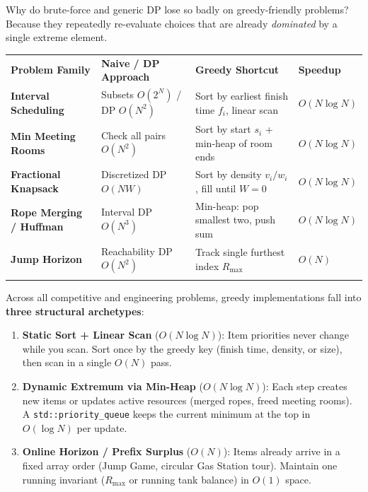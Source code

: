 \documentclass[11pt,a4paper]{article}
\theoremstyle{definition}
\begin{document}
Why do brute-force and generic DP lose so badly on greedy-friendly problems? Because they repeatedly re-evaluate choices that are already \emph{dominated} by a single extreme element.

\begingroup\small{}
\begin{tabularx}{\textwidth}{>{\raggedright\arraybackslash\bfseries}p{3.4cm} >{\raggedright\arraybackslash}p{3.5cm} >{\raggedright\arraybackslash}X >{\centering\arraybackslash}p{2.3cm}}
\arrayrulecolor{primaryblue}\toprule[1.2pt]
\rowcolor{primaryblue!10}
\textcolor{primaryblue}{\textbf{Problem Family}} & \textcolor{primaryblue}{\textbf{Naive / DP Approach}} & \textcolor{primaryblue}{\textbf{Greedy Shortcut}} & \textcolor{primaryblue}{\textbf{Speedup}} \\
\arrayrulecolor{codeframe}\midrule[0.6pt]
Interval Scheduling & Subsets $O(2^N)$ / DP $O(N^2)$ & Sort by earliest finish time $f_i$, linear scan & $O(N \log N)$ \\
Min Meeting Rooms & Check all pairs $O(N^2)$ & Sort by start $s_i$ + min-heap of room ends & $O(N \log N)$ \\
Fractional Knapsack & Discretized DP $O(N W)$ & Sort by density $v_i / w_i$, fill until $W = 0$ & $O(N \log N)$ \\
Rope Merging / Huffman & Interval DP $O(N^3)$ & Min-heap: pop smallest two, push sum & $O(N \log N)$ \\
Jump Horizon & Reachability DP $O(N^2)$ & Track single furthest index $R_{\max}$ & $O(N)$ \\
\arrayrulecolor{primaryblue}\bottomrule[1.2pt]
\end{tabularx}\endgroup

Across all competitive and engineering problems, greedy implementations fall into \textbf{three structural archetypes}:
\begin{enumerate}
    \item \textbf{Static Sort + Linear Scan} ($O(N \log N)$): Item priorities never change while you scan. Sort once by the greedy key (finish time, density, or size), then scan in a single $O(N)$ pass.
    \item \textbf{Dynamic Extremum via Min-Heap} ($O(N \log N)$): Each step creates new items or updates active resources (merged ropes, freed meeting rooms). A \texttt{std::priority\_queue} keeps the current minimum at the top in $O(\log N)$ per update.
    \item \textbf{Online Horizon / Prefix Surplus} ($O(N)$): Items already arrive in a fixed array order (Jump Game, circular Gas Station tour). Maintain one running invariant ($R_{\max}$ or running tank balance) in $O(1)$ space.
\end{enumerate}
\end{document}
